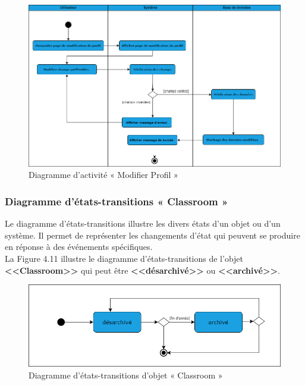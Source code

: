 \begin{figure}[H]
    \centering
    \includegraphics[width=\textwidth]{images/chp4/fig10.png}
    \caption{Diagramme d’activité « Modifier Profil »}
    \label{fig:Diagramme d’activité « Modifier Profil »}    
\end{figure}

\subsubsection{Diagramme d’états-transitions « Classroom »}
\justifying
Le diagramme d'états-transitions illustre les divers états d'un objet ou d'un système. Il permet de représenter les changements d’état qui peuvent se produire en réponse à des événements spécifiques.\\
La Figure 4.11 illustre le diagramme d’états-transitions de l’objet \textbf{<<Classroom>>} qui peut être  \textbf{<<désarchivé>>} ou  \textbf{<<archivé>>}.

\begin{figure}[H]
    \centering
    \includegraphics[width=\textwidth]{images/chp4/fig11.png}
    \caption{Diagramme d’états-transitions d'objet « Classroom »}
    \label{fig:Diagramme d’états-transitions d'objet « Classroom »}    
\end{figure}

